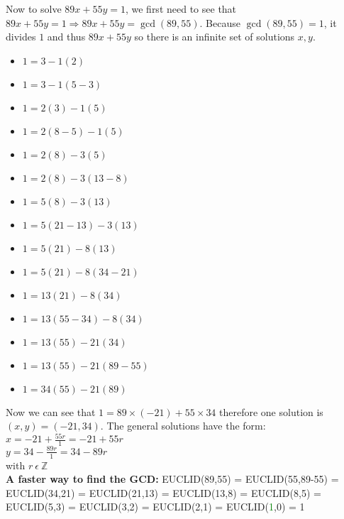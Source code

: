 \documentclass[11pt]{article}
\begin{document}
\begin{enumerate}
\begin{enumerate}
    \end{enumerate}
    Now to solve $89x+55y=1$, we first need to see that $89x+55y=1 \Rightarrow 89x+55y=\gcd(89, 55)$.
    Because $\gcd(89, 55) = 1$, it divides $1$ and thus $89x + 55y$ so there is an infinite set of solutions $x, y$.
    \begin{itemize}
        \item $1 = 3 - 1(2)$
        \item $1 = 3 - 1(5-3)$
        \item $1 = 2(3) - 1(5)$
        \item $1 = 2(8-5) - 1(5)$
        \item $1 = 2(8) - 3(5)$
        \item $1 = 2(8) - 3(13-8)$
        \item $1 = 5(8) - 3(13)$
        \item $1 = 5(21-13) - 3(13)$
        \item $1 = 5(21) - 8(13)$
        \item $1 = 5(21) - 8(34-21)$
        \item $1 = 13(21) - 8(34)$
        \item $1 = 13(55-34) - 8(34)$
        \item $1 = 13(55) - 21(34)$
        \item $1 = 13(55) - 21(89-55)$
        \item $1 = 34(55) - 21(89)$
    \end{itemize}
     Now we can see that $1 = 89 \times (-21) + 55 \times 34 $ therefore one solution is $(x, y) = (-21, 34)$.
     The general solutions have the form:
     \\ $x = -21 + \frac{55r}{1} = -21 + 55r$
     \\ $y = 34 - \frac{89r}{1} = 34 - 89r$
     \\ with $r \ \epsilon\ \mathbb{Z}$
     \\ \textbf{A faster way to find the GCD: } EUCLID(89,55) = EUCLID(55,89-55) = EUCLID(34,21) = EUCLID(21,13) = EUCLID(13,8) = EUCLID(8,5) = EUCLID(5,3) = EUCLID(3,2) = EUCLID(2,1) = EUCLID(\textcolor{green}{1},0) = 1
     



\end{enumerate}
\end{document}
